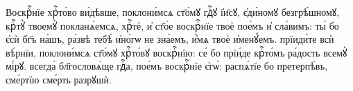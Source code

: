 \label{videvshe}

\hKv Воскрⷭ҇нїе хрⷭ҇то́во ви́дѣвше, поклони́мсѧ ст҃о́мꙋ гдⷭ҇ꙋ  і҆и҃сꙋ, є҆ди́номꙋ безгрѣ́шномꙋ,  крⷭ҇тꙋ̀ твоемꙋ̀ покланѧ́емсѧ, хрⷭ҇тѐ, и҆ ст҃о́е  воскрⷭ҇нїе твоѐ пое́мъ и҆ сла́вимъ: ты́ бо є҆сѝ бг҃ъ  на́шъ, ра́звѣ тебѣ̀ и҆но́гѡ не зна́емъ, и҆́мѧ твоѐ  и҆менꙋ́емъ. прїиди́те всѝ вѣ́рнїи, поклони́мсѧ ст҃о́мꙋ  хрⷭ҇то́вꙋ воскрⷭ҇нїю: се́ бо прїи́де крⷭ҇то́мъ ра́дость  всемꙋ̀ мі́рꙋ. всегда̀ бл҃гословѧ́ще гдⷭ҇а, пое́мъ воскрⷭ҇нїе  є҆гѡ̀: распѧ́тїе бо претерпѣ́въ, сме́ртїю сме́рть  разрꙋшѝ. 

